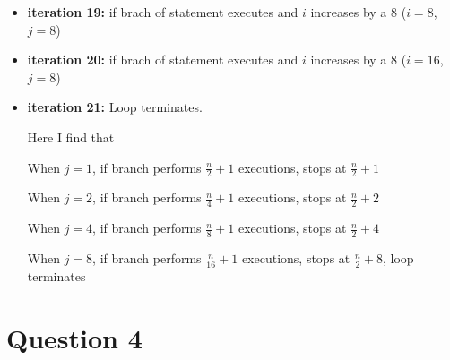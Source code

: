 \documentclass[12pt]{article}
\begin{document}
\begin{enumerate}[a.]
\begin{itemize}
\begin{itemize}
            \item \textbf{iteration 19:} if brach of statement executes and $i$ increases
            by a 8 ($i = 8$, $j = 8$)
            \item \textbf{iteration 20:} if brach of statement executes and $i$ increases
            by a 8 ($i = 16$, $j = 8$)
            \item \textbf{iteration 21:} Loop terminates.

            \bigskip

            Here I find that

            \bigskip

            When $j = 1$, if branch performs $\frac{n}{2} + 1$ executions, stops at $\frac{n}{2} + 1$

            When $j = 2$, if branch performs $\frac{n}{4} + 1$ executions, stops at $\frac{n}{2} + 2$

            When $j = 4$, if branch performs $\frac{n}{8} + 1$ executions, stops at $\frac{n}{2} + 4$

            When $j = 8$, if branch performs $\frac{n}{16} + 1$ executions, stops at $\frac{n}{2} + 8$, loop terminates

        \end{itemize}


    \end{itemize}

\end{enumerate}

\section*{Question 4}
\end{document}
